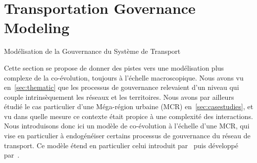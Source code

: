 




\section{Transportation Governance Modeling}{Modélisation de la Gouvernance du Système de Transport} 


\label{sec:lutecia}





Cette section se propose de donner des pistes vers une modélisation plus complexe de la co-évolution, toujours à l'échelle macroscopique. Nous avons vu en~\ref{sec:thematic} que les processus de gouvernance relevaient d'un niveau qui couple intrinsèquement les réseaux et les territoires. Nous avons par ailleurs étudié le cas particulier d'une Méga-région urbaine (MCR) en~\ref{sec:casestudies}, et vu dans quelle mesure ce contexte était propice à une complexité des interactions. Nous introduisons donc ici un modèle de co-évolution à l'échelle d'une MCR, qui vise en particulier à endogénéiser certains processus de gouvernance du réseau de transport. Ce modèle étend en particulier celui introduit par~\cite{le2010approche} puis développé par~\cite{lenechet:halshs-00674059}.


